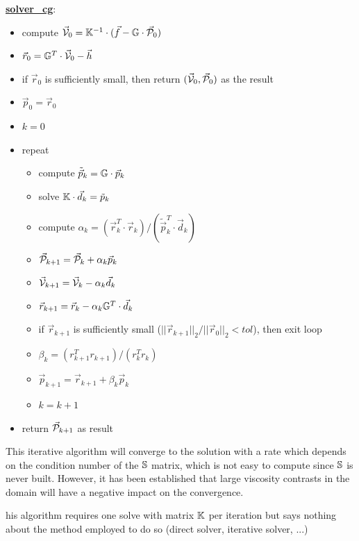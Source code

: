 \begin{mdframed}[backgroundcolor=blue!5]
\underline{\bf solver\_cg}:
\begin{itemize}
\item compute $\vec{\cal V}_0={\mathbb{K}}^{-1}\cdot (\vec{f}-{\mathbb{G}} \cdot \vec{\cal P}_0)$
\item $\vec{r}_0 = {\mathbb{G}}^T\cdot \vec{\cal V}_0 - \vec{h}$ 
\item if $\vec{r}_0$ is sufficiently small, then return $(\vec{\cal V}_0,\vec{\cal P}_0)$ as the result
\item $\vec{p}_0=\vec{r}_0$
\item $k=0$
\item repeat
\begin{itemize}
\item compute $\tilde{\vec{p}}_k = {\mathbb{G}} \cdot \vec{p}_k$
\item solve ${\mathbb{K}}\cdot \vec{d}_k = \tilde{p}_k$
\item compute $\alpha_k=(\vec{r}_k^T \cdot  \vec{r}_k)/(\tilde{\vec{p}}_k^T \cdot \vec{d}_k)$
\item $\vec{\cal P}_{k+1} = \vec{\cal P}_k+\alpha_k \vec{p}_k$
\item $ \vec{\cal V}_{k+1} = \vec{\cal V}_k - \alpha_k \vec{d}_k$
\item $\vec{r}_{k+1} = \vec{r}_k - \alpha_k {\mathbb{G}}^T \cdot \vec{d}_k $
\item if $\vec{r}_{k+1}$ is sufficiently small ($||\vec{r}_{k+1}||_2/||\vec{r}_0||_2 <tol$), then exit loop
\item $\beta_k=(r_{k+1}^T r_{k+1})/(r_k^T r_k)$
\item $\vec{p}_{k+1} =\vec{r}_{k+1}+ \beta_k \vec{p}_k$
\item $k=k+1$
\end{itemize}
\item return $\vec{\cal P}_{k+1}$ as result
\end{itemize}
\end{mdframed}

This iterative algorithm will converge to the solution with a rate which depends on 
the condition number of the ${\mathbb{S}}$ matrix, which is not easy to compute since 
${\mathbb{S}}$ is never built. However, it has been established that large viscosity contrasts in the domain 
will have a negative impact on the convergence. 

\begin{remark} 
his algorithm requires one solve with matrix ${\mathbb{K}}$ per iteration 
but says nothing about the method employed to do so (direct solver, iterative solver, ...)
\end{remark} 

